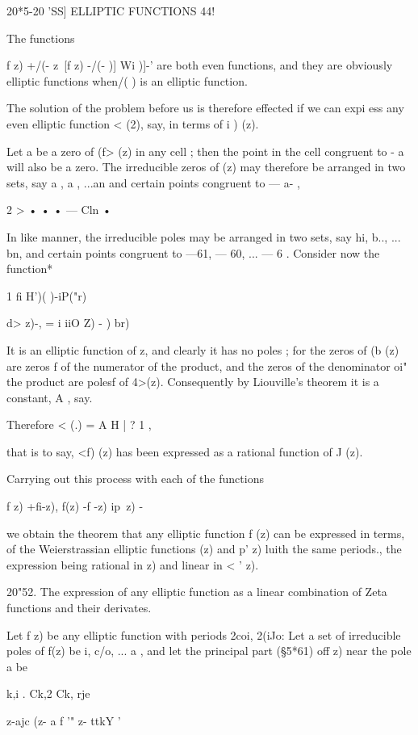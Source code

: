 {20*5-20 'SS] ELLIPTIC FUNCTIONS 44!

The functions

f z) +/(- z\ [f z) -/(- )] Wi )]-' are both even functions, and they
are obviously elliptic functions when/( ) is an elliptic function.

The solution of the problem before us is therefore effected if we can
expi ess any even elliptic function < (2), say, in terms of i ) (z).

Let a be a zero of (f> (z) in any cell ; then the point in the cell
congruent to - a will also be a zero. The irreducible zeros of (z) may
therefore be arranged in two sets, say a , a , ...an and certain
points congruent to — a- ,

 2 > • • • — Cln •

In like manner, the irreducible poles may be arranged in two sets, say
hi, b.., ... bn, and certain points congruent to —61, — 60, ... — 6 .
Consider now the function*

1 fi H')( )-iP("r)



d> z)-, = i iiO Z) - ) br)

It is an elliptic function of z, and clearly it has no poles ; for the
zeros of (b (z) are zeros f of the numerator of the product, and the
zeros of the denominator oi" the product are polesf of 4>(z).
Consequently by Liouville's theorem it is a constant, A , say.

Therefore < (.) = A H | ? 1 ,

that is to say, <f) (z) has been expressed as a rational function of J
(z).

Carrying out this process with each of the functions

f z) +fi-z), f(z) -f -z) ip\ z) -\

we obtain the theorem that any elliptic function f (z) can be
expressed in terms, of the Weierstrassian elliptic functions (z) and
p' z) luith the same periods., the expression being rational in z) and
linear in < ' z).

20"52. The expression of any elliptic function as a linear combination
of Zeta functions and their derivates.

Let f z) be any elliptic function with periods 2coi, 2(iJo: Let a set
of irreducible poles of f(z) be i, c/o, ... a , and let the principal
part (§5*61) off z) near the pole a be

 k,i . Ck,2 Ck, rje



z-ajc (z- a f '" z- ttkY '

}
